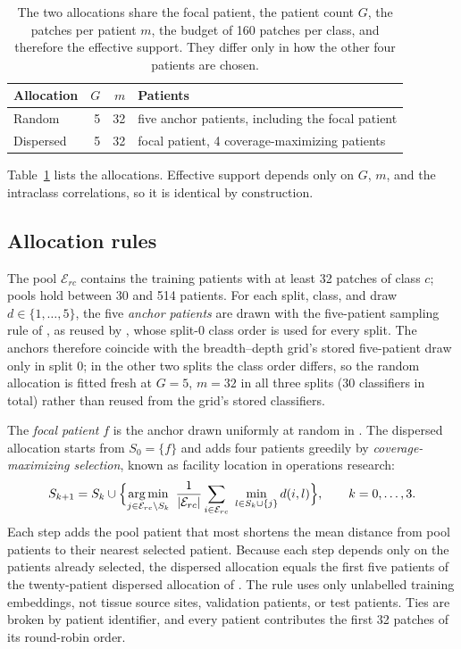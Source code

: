 \documentclass[11pt]{article}
\begin{document}
\begin{table}[htbp]
\centering
\renewcommand{\arraystretch}{1.15}
\begin{tabular}{@{}lrrl@{}}
\toprule
Allocation & $G$ & $m$ & Patients \\
\midrule
Random & 5 & 32 & five anchor patients, including the focal patient \\
Dispersed & 5 & 32 & focal patient, 4 coverage-maximizing patients \\
\bottomrule
\end{tabular}
\caption{The two allocations share the focal patient, the patient count $G$, the patches per patient $m$, the budget of 160 patches per class, and therefore the effective support. They differ only in how the other four patients are chosen.}
\label{tab:allocations}
\end{table}

\noindent Table~\ref{tab:allocations} lists the allocations. Effective support depends only on $G$, $m$, and the intraclass correlations, so it is identical by construction.

\subsection{Allocation rules}
\label{sec:allocation}
The pool $\mathcal E_{rc}$ contains the training patients with at least 32 patches of class $c$; pools hold between 30 and 514 patients. For each split, class, and draw $d\in\{1,\ldots,5\}$, the five \emph{anchor patients} are drawn with the five-patient sampling rule of \citet{queisler2026effectiveSupport}, as reused by \citet{queisler2026cohortComposition}, whose split-0 class order is used for every split. The anchors therefore coincide with the breadth--depth grid's stored five-patient draw only in split 0; in the other two splits the class order differs, so the random allocation is fitted fresh at $G=5$, $m=32$ in all three splits (30 classifiers in total) rather than reused from the grid's stored classifiers.

The \emph{focal patient} $f$ is the anchor drawn uniformly at random in \citet{queisler2026cohortComposition}. The dispersed allocation starts from $S_0=\{f\}$ and adds four patients greedily by \emph{coverage-maximizing selection}, known as facility location in operations research:
\begin{equation}
 S_{k+1}=S_k\cup\Bigl\{\operatorname*{arg\,min}_{j\in\mathcal E_{rc}\setminus S_k}\ \frac{1}{|\mathcal E_{rc}|}\sum_{i\in\mathcal E_{rc}}\ \min_{l\in S_k\cup\{j\}} d(i,l)\Bigr\},\qquad k=0,\ldots,3.
 \label{eq:facility}
\end{equation}
\noindent Each step adds the pool patient that most shortens the mean distance from pool patients to their nearest selected patient. Because each step depends only on the patients already selected, the dispersed allocation equals the first five patients of the twenty-patient dispersed allocation of \citet{queisler2026cohortComposition}. The rule uses only unlabelled training embeddings, not tissue source sites, validation patients, or test patients. Ties are broken by patient identifier, and every patient contributes the first 32 patches of its round-robin order.
\end{document}
